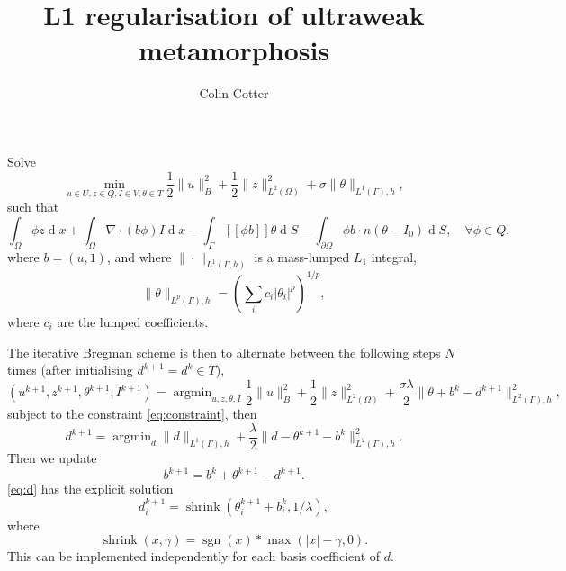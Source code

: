 \documentclass{article}
\DeclareMathOperator{\diff}{d}
\DeclareMathOperator{\argmin}{argmin}
\DeclareMathOperator{\sgn}{sgn}
\DeclareMathOperator{\shrink}{shrink}
\begin{document}
\title{{L1 regularisation of ultraweak metamorphosis}}
\author{Colin Cotter}
\maketitle

Solve
\[
\min_{u \in U,z \in Q,I \in V,\theta \in T} \frac{1}{2}\|u\|_B^2
+ \frac{1}{2}\|z\|_{L^2(\Omega)}^2 + \sigma \|\theta \|_{L^1(\Gamma),h},
\]
such that
\begin{equation}
  \label{eq:constraint}
\int_\Omega \phi z \diff x + \int_\Omega \nabla\cdot(b \phi) I \diff x
- \int_{\Gamma} [[\phi b]] \theta \diff S - \int_{\partial\Omega} \phi b\cdot n
(\theta-I_0) \diff S, \quad \forall \phi \in Q,
\end{equation}
where $b=(u,1)$, and where $\|\cdot\|_{L^1(\Gamma,h)}$ is a mass-lumped
$L_1$ integral,
\[
\|\theta \|_{L^p(\Gamma),h} = \left(\sum_i c_i |\theta_i|^p\right)^{1/p},
\]
where $c_i$ are the lumped coefficients.

The iterative Bregman scheme is then to alternate between the
following steps $N$ times (after initialising $d^{k+1}=d^k \in T$),
\begin{equation}
\label{eq:u}
  (u^{k+1},z^{k+1},\theta^{k+1},I^{k+1})
= \argmin_{u,z,\theta, I} \frac{1}{2}\|u\|_B^2
+ \frac{1}{2}\|z\|_{L^2(\Omega)}^2 + \frac{\sigma\lambda}{2}
\|\theta + b^k - d^{k+1}\|_{L^2(\Gamma),h}^2,
\end{equation}
subject to the constraint \eqref{eq:constraint},
then
\begin{equation}
  \label{eq:d}
d^{k+1} = \argmin_d \|d\|_{L^1(\Gamma),h}
+ \frac{\lambda}{2}\|d-\theta^{k+1}-b^k\|_{L^2(\Gamma), h}^2.
\end{equation}
Then we update
\[
b^{k+1} = b^k + \theta^{k+1} - d^{k+1}.
\]
\eqref{eq:d} has the explicit solution
\[
d^{k+1}_i = \shrink(\theta^{k+1}_i + b^k_i, 1/\lambda),
\]
where
\[
\shrink(x, \gamma) = \sgn(x)*\max(|x|-\gamma, 0).
\]
This can be implemented independently for each basis coefficient of $d$.
\end{document}
